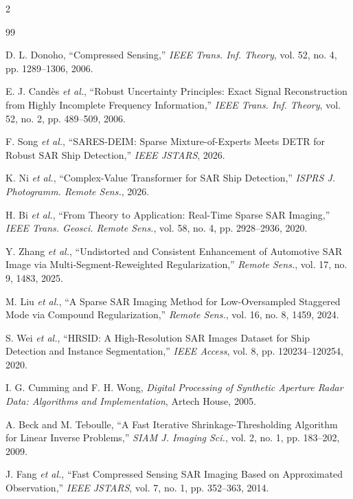 \documentclass[11pt,fontset=none]{ctexart}
\begin{document}
\begin{multicols}{2}
\footnotesize
\begin{thebibliography}{99}
\setlength{\itemsep}{0pt}

D. L. Donoho, ``Compressed Sensing,'' \textit{IEEE Trans. Inf. Theory}, vol. 52, no. 4, pp. 1289--1306, 2006.

E. J. Cand\`es \textit{et al.}, ``Robust Uncertainty Principles: Exact Signal Reconstruction from Highly Incomplete Frequency Information,'' \textit{IEEE Trans. Inf. Theory}, vol. 52, no. 2, pp. 489--509, 2006.

F. Song \textit{et al.}, ``SARES-DEIM: Sparse Mixture-of-Experts Meets DETR for Robust SAR Ship Detection,'' \textit{IEEE JSTARS}, 2026.

K. Ni \textit{et al.}, ``Complex-Value Transformer for SAR Ship Detection,'' \textit{ISPRS J. Photogramm. Remote Sens.}, 2026.

H. Bi \textit{et al.}, ``From Theory to Application: Real-Time Sparse SAR Imaging,'' \textit{IEEE Trans. Geosci. Remote Sens.}, vol. 58, no. 4, pp. 2928--2936, 2020.

Y. Zhang \textit{et al.}, ``Undistorted and Consistent Enhancement of Automotive SAR Image via Multi-Segment-Reweighted Regularization,'' \textit{Remote Sens.}, vol. 17, no. 9, 1483, 2025.

M. Liu \textit{et al.}, ``A Sparse SAR Imaging Method for Low-Oversampled Staggered Mode via Compound Regularization,'' \textit{Remote Sens.}, vol. 16, no. 8, 1459, 2024.

S. Wei \textit{et al.}, ``HRSID: A High-Resolution SAR Images Dataset for Ship Detection and Instance Segmentation,'' \textit{IEEE Access}, vol. 8, pp. 120234--120254, 2020.

I. G. Cumming and F. H. Wong, \textit{Digital Processing of Synthetic Aperture Radar Data: Algorithms and Implementation}, Artech House, 2005.

A. Beck and M. Teboulle, ``A Fast Iterative Shrinkage-Thresholding Algorithm for Linear Inverse Problems,'' \textit{SIAM J. Imaging Sci.}, vol. 2, no. 1, pp. 183--202, 2009.

J. Fang \textit{et al.}, ``Fast Compressed Sensing SAR Imaging Based on Approximated Observation,'' \textit{IEEE JSTARS}, vol. 7, no. 1, pp. 352--363, 2014.

\end{thebibliography}
\end{multicols}
\end{document}
